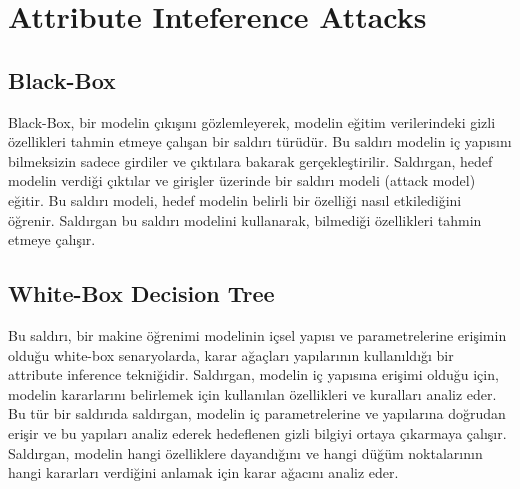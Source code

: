 \section{Attribute Inteference Attacks}

\subsection{Black-Box}

Black-Box, bir modelin çıkışını gözlemleyerek, modelin eğitim verilerindeki gizli özellikleri tahmin etmeye çalışan bir saldırı türüdür. Bu saldırı modelin iç yapısını bilmeksizin sadece girdiler ve çıktılara bakarak gerçekleştirilir. Saldırgan, hedef modelin verdiği çıktılar ve girişler üzerinde bir saldırı modeli (attack model) eğitir. Bu saldırı modeli, hedef modelin belirli bir özelliği nasıl etkilediğini öğrenir. Saldırgan bu saldırı modelini kullanarak, bilmediği özellikleri tahmin etmeye çalışır.

\newpage

\subsection{White-Box Decision Tree}

Bu saldırı, bir makine öğrenimi modelinin içsel yapısı ve parametrelerine erişimin olduğu white-box senaryolarda, karar ağaçları yapılarının kullanıldığı bir attribute inference tekniğidir. Saldırgan, modelin iç yapısına erişimi olduğu için, modelin kararlarını belirlemek için kullanılan özellikleri ve kuralları analiz eder. Bu tür bir saldırıda saldırgan, modelin iç parametrelerine ve yapılarına doğrudan erişir ve bu yapıları analiz ederek hedeflenen gizli bilgiyi ortaya çıkarmaya çalışır. Saldırgan, modelin hangi özelliklere dayandığını ve hangi düğüm noktalarının hangi kararları verdiğini anlamak için karar ağacını analiz eder.

\newpage